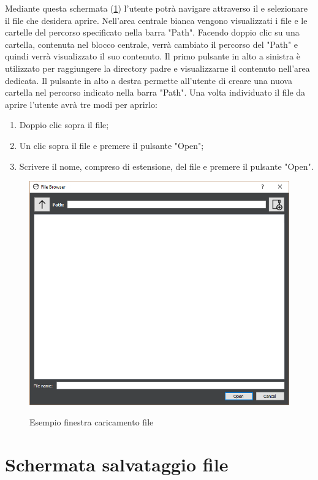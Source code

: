 \documentclass[../AnalisideiRequisiti.tex]{subfiles}
\begin{document}
		Mediante questa schermata (\ref{fig:filebrowser-load}) l'utente potrà navigare attraverso il  e selezionare il file che desidera aprire. 
		Nell'area centrale bianca vengono visualizzati i file e le cartelle del percorso specificato nella barra "Path". Facendo doppio clic su una cartella, contenuta nel blocco centrale, verrà cambiato il percorso del "Path" e quindi verrà visualizzato il suo contenuto.
		Il primo pulsante in alto a sinistra è utilizzato per raggiungere la directory padre e visualizzarne il contenuto nell'area dedicata.
		Il pulsante in alto a destra permette all'utente di creare una nuova cartella nel percorso indicato nella barra "Path". 
		Una volta individuato il file da aprire l'utente avrà tre modi per aprirlo:
		\begin{enumerate}
			\item{} Doppio clic sopra il file;
			\item{} Un clic sopra il file e premere il pulsante "Open";
			\item{} Scrivere il nome, compreso di estensione, del file e premere il pulsante "Open".
		\end{enumerate}
		\begin{figure}[htp]
			\caption{Esempio finestra caricamento file}
			\centering
			\includegraphics[width=\textwidth]{../img/filebrowser-load.png}
			\label{fig:filebrowser-load}
		\end{figure}

	\section{Schermata salvataggio file}
	
\end{document}
